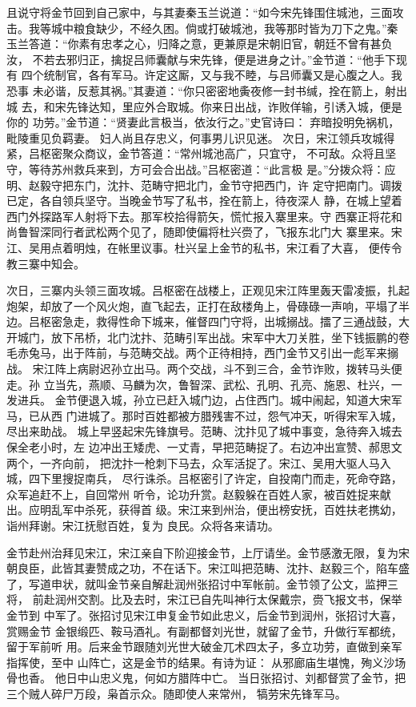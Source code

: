 且说守将金节回到自己家中，与其妻秦玉兰说道：“如今宋先锋围住城池，三面攻
击。我等城中粮食缺少，不经久困。倘或打破城池，我等那时皆为刀下之鬼。”秦
玉兰答道：“你素有忠孝之心，归降之意，更兼原是宋朝旧官，朝廷不曾有甚负汝，
不若去邪归正，擒捉吕师囊献与宋先锋，便是进身之计。”金节道：“他手下现有
四个统制官，各有军马。许定这厮，又与我不睦，与吕师囊又是心腹之人。我恐事
未必谐，反惹其祸。”其妻道：“你只密密地夤夜修一封书缄，拴在箭上，射出城
去，和宋先锋达知，里应外合取城。你来日出战，诈败佯输，引诱入城，便是你的
功劳。”金节道：“贤妻此言极当，依汝行之。”史官诗曰：
弃暗投明免祸机，毗陵重见负羁妻。
妇人尚且存忠义，何事男儿识见迷。
次日，宋江领兵攻城得紧，吕枢密聚众商议，金节答道：“常州城池高广，只宜守，
不可敌。众将且坚守，等待苏州救兵来到，方可会合出战。”吕枢密道：“此言极
是。”分拨众将：应明、赵毅守把东门，沈抃、范畴守把北门，金节守把西门，许
定守把南门。调拨已定，各自领兵坚守。当晚金节写了私书，拴在箭上，待夜深人
静，在城上望着西门外探路军人射将下去。那军校拾得箭矢，慌忙报入寨里来。守
西寨正将花和尚鲁智深同行者武松两个见了，随即使偏将杜兴赍了，飞报东北门大
寨里来。宋江、吴用点着明烛，在帐里议事。杜兴呈上金节的私书，宋江看了大喜，
便传令教三寨中知会。

次日，三寨内头领三面攻城。吕枢密在战楼上，正观见宋江阵里轰天雷凌振，扎起
炮架，却放了一个风火炮，直飞起去，正打在敌楼角上，骨碌碌一声响，平塌了半
边。吕枢密急走，救得性命下城来，催督四门守将，出城搦战。擂了三通战鼓，大
开城门，放下吊桥，北门沈抃、范畴引军出战。宋军中大刀关胜，坐下钱振鹏的卷
毛赤兔马，出于阵前，与范畴交战。两个正待相持，西门金节又引出一彪军来搦战。
宋江阵上病尉迟孙立出马。两个交战，斗不到三合，金节诈败，拨转马头便走。孙
立当先，燕顺、马麟为次，鲁智深、武松、孔明、孔亮、施恩、杜兴，一发进兵。
金节便退入城，孙立已赶入城门边，占住西门。城中闹起，知道大宋军马，已从西
门进城了。那时百姓都被方腊残害不过，怨气冲天，听得宋军入城，尽出来助战。
城上早竖起宋先锋旗号。范畴、沈抃见了城中事变，急待奔入城去保全老小时，左
边冲出王矮虎、一丈青，早把范畴捉了。右边冲出宣赞、郝思文两个，一齐向前，
把沈抃一枪刺下马去，众军活捉了。宋江、吴用大驱人马入城，四下里搜捉南兵，
尽行诛杀。吕枢密引了许定，自投南门而走，死命夺路，众军追赶不上，自回常州
听令，论功升赏。赵毅躲在百姓人家，被百姓捉来献出。应明乱军中杀死，获得首
级。宋江来到州治，便出榜安抚，百姓扶老携幼，诣州拜谢。宋江抚慰百姓，复为
良民。众将各来请功。

金节赴州治拜见宋江，宋江亲自下阶迎接金节，上厅请坐。金节感激无限，复为宋
朝良臣，此皆其妻赞成之功，不在话下。宋江叫把范畴、沈抃、赵毅三个，陷车盛
了，写道申状，就叫金节亲自解赴润州张招讨中军帐前。金节领了公文，监押三将，
前赴润州交割。比及去时，宋江已自先叫神行太保戴宗，赍飞报文书，保举金节到
中军了。张招讨见宋江申复金节如此忠义，后金节到润州，张招讨大喜，赏赐金节
金银缎匹、鞍马酒礼。有副都督刘光世，就留了金节，升做行军都统，留于军前听
用。后来金节跟随刘光世大破金兀术四太子，多立功劳，直做到亲军指挥使，至中
山阵亡，这是金节的结果。有诗为证：
从邪廊庙生堪愧，殉义沙场骨也香。
他日中山忠义鬼，何如方腊阵中亡。
当日张招讨、刘都督赏了金节，把三个贼人碎尸万段，枭首示众。随即使人来常州，
犒劳宋先锋军马。

